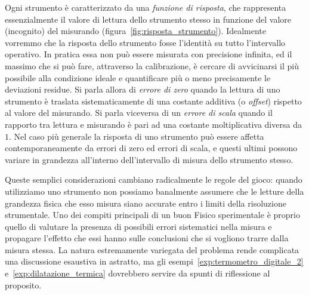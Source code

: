 Ogni strumento è caratterizzato da una \emph{funzione di risposta}, che
rappresenta essenzialmente il valore di lettura dello strumento stesso in
funzione del valore (incognito) del misurando
(figura~\ref{fig:risposta_strumento}).
Idealmente vorremmo che la risposta dello strumento fosse l'identità su tutto
l'intervallo operativo. In pratica essa non può essere misurata con
precisione infinita, ed il massimo che si può fare, attraverso la
calibrazione, è cercare di avvicinarsi il più possibile alla condizione
ideale e quantificare più o meno precisamente le deviazioni residue.
Si parla allora di \emph{errore di zero} quando la lettura di uno strumento è
traslata sistematicamente di una costante additiva (o \emph{offset}) rispetto
al valore del misurando. Si parla viceversa di un \emph{errore di scala}
quando il rapporto tra lettura e misurando è pari ad una costante
moltiplicativa diversa da $1$. Nel caso più generale la risposta di uno
strumento può essere affetta contemporaneamente da errori di zero ed errori
di scala, e questi ultimi possono variare in grandezza all'interno
dell'intervallo di misura dello strumento stesso.

Queste semplici considerazioni cambiano radicalmente le regole del gioco:
quando utilizziamo uno strumento non possiamo banalmente assumere che le
letture della grandezza fisica che esso misura siano accurate entro i limiti
della risoluzione strumentale. Uno dei compiti principali di un buon Fisico
sperimentale è proprio quello di valutare la presenza di possibili errori
sistematici nella misura e propagare l'effetto che essi hanno sulle conclusioni
che si vogliono trarre dalla misura stessa. La natura estremamente variegata
del problema rende complicata una discussione esaustiva in astratto, ma gli
esempi~\ref{exp:termometro_digitale_2} e~\ref{exp:dilatazione_termica}
dovrebbero servire da spunti di riflessione al proposito.

